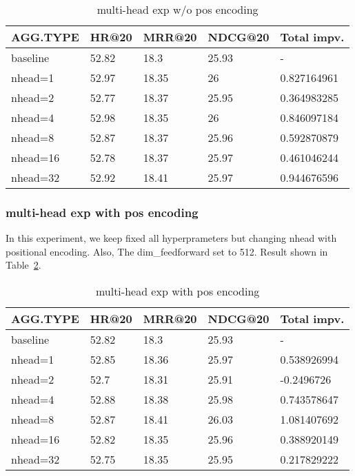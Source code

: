 \documentclass{article}
\begin{document}
\begin{table}
    \caption{multi-head exp w/o pos encoding}
    \label{multi-head exp w/o pos encoding}
    \centering
    \begin{tabular}{lllll}
        \toprule
        AGG.TYPE & HR@20 & MRR@20 & NDCG@20 & Total impv. \\
        \midrule
        baseline & 52.82 & 18.3   & 25.93   & -           \\
        nhead=1  & 52.97 & 18.35  & 26      & 0.827164961 \\
        nhead=2  & 52.77 & 18.37  & 25.95   & 0.364983285 \\
        nhead=4  & 52.98 & 18.35  & 26      & 0.846097184 \\
        nhead=8  & 52.87 & 18.37  & 25.96   & 0.592870879 \\
        nhead=16 & 52.78 & 18.37  & 25.97   & 0.461046244 \\
        nhead=32 & 52.92 & 18.41  & 25.97   & 0.944676596 \\
        \bottomrule
    \end{tabular}
\end{table}


\subsubsection{multi-head exp with pos encoding}

In this experiment, we keep fixed all hyperprameters but
changing nhead with positional encoding.
Also, The dim\_feedforward set to 512.
Result shown in Table~\ref{multi-head exp with pos encoding}.

\begin{table}
    \caption{multi-head exp with pos encoding}
    \label{multi-head exp with pos encoding}
    \centering
    \begin{tabular}{lllll}
        \toprule
        AGG.TYPE & HR@20 & MRR@20 & NDCG@20 & Total impv. \\
        \midrule
        baseline & 52.82 & 18.3   & 25.93   & -           \\
        nhead=1  & 52.85 & 18.36  & 25.97   & 0.538926994 \\
        nhead=2  & 52.7  & 18.31  & 25.91   & -0.2496726  \\
        nhead=4  & 52.88 & 18.38  & 25.98   & 0.743578647 \\
        nhead=8  & 52.87 & 18.41  & 26.03   & 1.081407692 \\
        nhead=16 & 52.82 & 18.35  & 25.96   & 0.388920149 \\
        nhead=32 & 52.75 & 18.35  & 25.95   & 0.217829222 \\
        \bottomrule
    \end{tabular}
\end{table}
\end{document}
